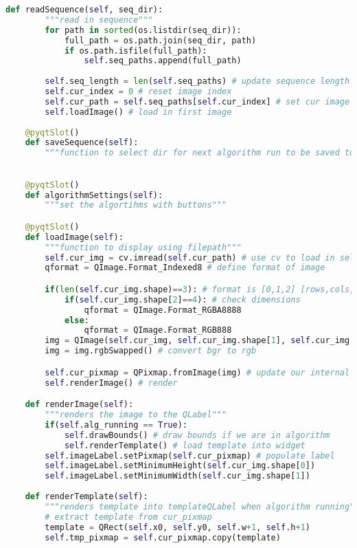 \begin{lstlisting}[language=Python, caption={GUI Impementation Code}, captionpos=b, label={lst:gui}]
    def readSequence(self, seq_dir):
        """read in sequence"""
        for path in sorted(os.listdir(seq_dir)):
            full_path = os.path.join(seq_dir, path)
            if os.path.isfile(full_path):
                self.seq_paths.append(full_path)
        
        self.seq_length = len(self.seq_paths) # update sequence length
        self.cur_index = 0 # reset image index
        self.cur_path = self.seq_paths[self.cur_index] # set cur image to first image in self.seq_paths
        self.loadImage() # load in first image
  
    @pyqtSlot()
    def saveSequence(self):
        """function to select dir for next algorithm run to be saved to"""
        

    @pyqtSlot()
    def algorithmSettings(self):
        """set the algortihms with buttons"""

    @pyqtSlot()
    def loadImage(self):
        """function to display using filepath"""
        self.cur_img = cv.imread(self.cur_path) # use cv to load in self.cur_img
        qformat = QImage.Format_Indexed8 # define format of image

        if(len(self.cur_img.shape)==3): # format is [0,1,2] [rows,cols,components]
            if(self.cur_img.shape[2]==4): # check dimensions
                qformat = QImage.Format_RGBA8888
            else:
                qformat = QImage.Format_RGB888
        img = QImage(self.cur_img, self.cur_img.shape[1], self.cur_img.shape[0], self.cur_img.strides[0], qformat)
        img = img.rgbSwapped() # convert bgr to rgb

        self.cur_pixmap = QPixmap.fromImage(img) # update our internal current pixmap
        self.renderImage() # render

    def renderImage(self):
        """renders the image to the QLabel"""
        if(self.alg_running == True):
            self.drawBounds() # draw bounds if we are in algorithm
            self.renderTemplate() # load template into widget
        self.imageLabel.setPixmap(self.cur_pixmap) # populate label
        self.imageLabel.setMinimumHeight(self.cur_img.shape[0])
        self.imageLabel.setMinimumWidth(self.cur_img.shape[1])
        
    def renderTemplate(self):
        """renders template into templateQLabel when algorithm running"""
        # extract template from cur_pixmap
        template = QRect(self.x0, self.y0, self.w+1, self.h+1)
        self.tmp_pixmap = self.cur_pixmap.copy(template)


\end{lstlisting}
